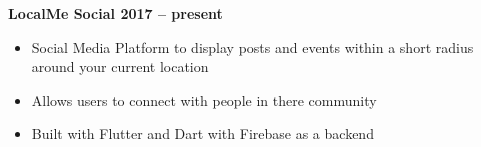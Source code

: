 \textbf{{LocalMe Social} \hfill 2017 -- present} \par
\begin{itemize}
	\item Social Media Platform to display posts and events within a short radius around your current location
    \item Allows users to connect with people in there community
    \item Built with Flutter and Dart with Firebase as a backend
\end{itemize}\vspace{0.1cm}\par